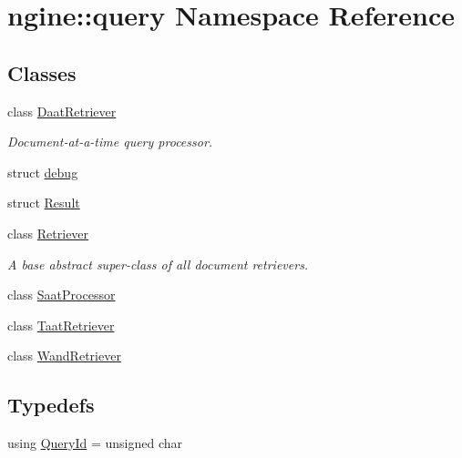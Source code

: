 \hypertarget{namespacengine_1_1query}{}\section{ngine\+:\+:query Namespace Reference}
\label{namespacengine_1_1query}
\subsection*{Classes}
\begin{DoxyCompactItemize}
\item 
class \hyperlink{classngine_1_1query_1_1DaatRetriever}{Daat\+Retriever}
\begin{DoxyCompactList}\small\item\em Document-\/at-\/a-\/time query processor. \end{DoxyCompactList}\item 
struct \hyperlink{structngine_1_1query_1_1debug}{debug}
\item 
struct \hyperlink{structngine_1_1query_1_1Result}{Result}
\item 
class \hyperlink{classngine_1_1query_1_1Retriever}{Retriever}
\begin{DoxyCompactList}\small\item\em A base abstract super-\/class of all document retrievers. \end{DoxyCompactList}\item 
class \hyperlink{classngine_1_1query_1_1SaatProcessor}{Saat\+Processor}
\item 
class \hyperlink{classngine_1_1query_1_1TaatRetriever}{Taat\+Retriever}
\item 
class \hyperlink{classngine_1_1query_1_1WandRetriever}{Wand\+Retriever}
\end{DoxyCompactItemize}
\subsection*{Typedefs}
\begin{DoxyCompactItemize}
\item 
using \hyperlink{namespacengine_1_1query_a3deddbc36af48dca2072f880a752b001}{Query\+Id} = unsigned char
\end{DoxyCompactItemize}
